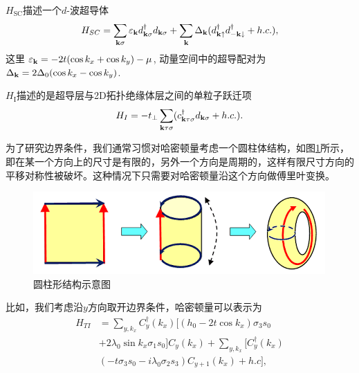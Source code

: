 \qquad $H_\mathrm{SC}$描述一个$d$-波超导体
\begin{equation}
H_{SC}=\sum_{{\bf k}\sigma}\varepsilon_{\bf k}d^\dagger_{{\bf k}\sigma}d_{{\bf k}\sigma}+\sum_{{\bf k}}\Delta_{\bf k}(d^\dagger_{{\bf k}\uparrow}d^\dagger_{{-\bf k}\downarrow}+h.c.),
\end{equation}
这里 $\varepsilon_{\bf k}=-2t(\cos k_x+\cos k_y)-\mu$, 动量空间中的超导配对为 $\Delta_{\bf k}=2\Delta_0 (\cos k_x-\cos k_y)$.

\qquad $H_\mathrm{I}$描述的是超导层与2D拓扑绝缘体层之间的单粒子跃迁项
\begin{equation}
H_{I}=-t_\perp \sum_{{\bf k}\tau\sigma}(c_{{\bf k}\tau\sigma}^\dagger d_{{\bf k}\sigma}+h.c.).
\end{equation}

\qquad 为了研究边界条件，我们通常习惯对哈密顿量考虑一个圆柱体结构，如图\ref{fig15}所示，即在某一个方向上的尺寸是有限的，另外一个方向是周期的，这样有限尺寸方向的平移对称性被破坏。这种情况下只需要对哈密顿量沿这个方向做傅里叶变换。
\begin{figure}
\centering
\includegraphics[scale=0.6]{pic/fig16}
\caption{圆柱形结构示意图}\label{fig15}
\end{figure}


\qquad 比如，我们考虑沿$y$方向取开边界条件，哈密顿量可以表示为
\begin{equation}
	\begin{aligned}
		H_{TI} &= \sum_{y,k_x}C^\dagger_{y}(k_x)[(h_0-2t\cos k_x)\sigma_3s_0 \\&+2\lambda_0\sin k_x\sigma_1s_0]C_{y}(k_x)
		+\sum_{y,k_x}[C^\dagger_{y}(k_x)\\&(-t\sigma_3s_0-i\lambda_0\sigma_2s_3)C_{y+1}(k_x)+h.c],
	\end{aligned}
\end{equation}

